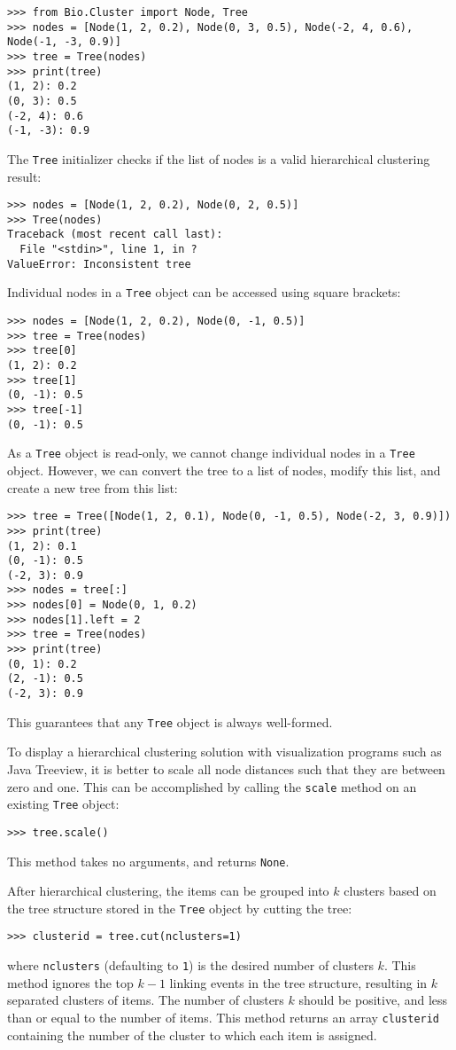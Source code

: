\documentclass{report}
\begin{document}
\begin{verbatim}
>>> from Bio.Cluster import Node, Tree
>>> nodes = [Node(1, 2, 0.2), Node(0, 3, 0.5), Node(-2, 4, 0.6), Node(-1, -3, 0.9)]
>>> tree = Tree(nodes)
>>> print(tree)
(1, 2): 0.2
(0, 3): 0.5
(-2, 4): 0.6
(-1, -3): 0.9
\end{verbatim}

The \verb|Tree| initializer checks if the list of nodes is a valid hierarchical clustering result:

\begin{verbatim}
>>> nodes = [Node(1, 2, 0.2), Node(0, 2, 0.5)]
>>> Tree(nodes)
Traceback (most recent call last):
  File "<stdin>", line 1, in ?
ValueError: Inconsistent tree
\end{verbatim}

Individual nodes in a \verb|Tree| object can be accessed using square brackets:

\begin{verbatim}
>>> nodes = [Node(1, 2, 0.2), Node(0, -1, 0.5)]
>>> tree = Tree(nodes)
>>> tree[0]
(1, 2): 0.2
>>> tree[1]
(0, -1): 0.5
>>> tree[-1]
(0, -1): 0.5
\end{verbatim}

As a \verb|Tree| object is read-only, we cannot change individual nodes in a \verb|Tree| object. However, we can convert the tree to a list of nodes, modify this list, and create a new tree from this list:

\begin{verbatim}
>>> tree = Tree([Node(1, 2, 0.1), Node(0, -1, 0.5), Node(-2, 3, 0.9)])
>>> print(tree)
(1, 2): 0.1
(0, -1): 0.5
(-2, 3): 0.9
>>> nodes = tree[:]
>>> nodes[0] = Node(0, 1, 0.2)
>>> nodes[1].left = 2
>>> tree = Tree(nodes)
>>> print(tree)
(0, 1): 0.2
(2, -1): 0.5
(-2, 3): 0.9
\end{verbatim}

This guarantees that any \verb|Tree| object is always well-formed. 

To display a hierarchical clustering solution with visualization programs such as Java Treeview, it is better to scale all node distances such that they are between zero and one. This can be accomplished by calling the \verb|scale| method on an existing \verb|Tree| object:
\begin{verbatim}
>>> tree.scale()
\end{verbatim}
This method takes no arguments, and returns \verb|None|.

After hierarchical clustering, the items can be grouped into $k$ clusters based on the tree structure stored in the \verb|Tree| object by cutting the tree:
\begin{verbatim}
>>> clusterid = tree.cut(nclusters=1)
\end{verbatim}
where \verb|nclusters| (defaulting to \verb|1|) is the desired number of clusters $k$.
This method ignores the top $k-1$ linking events in the tree structure, resulting in $k$ separated clusters of items. The number of clusters $k$ should be positive, and less than or equal to the number of items.
This method returns an array \verb|clusterid| containing the number of the cluster to which each item is assigned.
\end{document}
